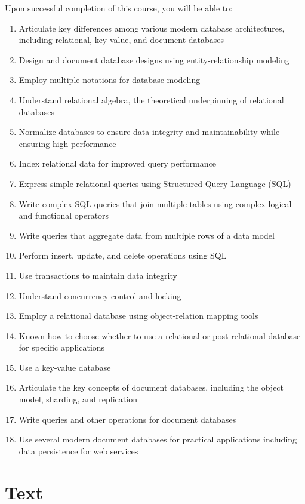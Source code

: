 \documentclass[11pt]{article}
\begin{document}
Upon successful completion of this course,
you will be able to:
\begin{enumerate}
\item Articulate key differences among various modern database architectures,
  including relational, key-value, and document databases
\item Design and document database designs using entity-relationship modeling
\item Employ multiple notations for database modeling
\item Understand relational algebra,
  the theoretical underpinning of relational databases
\item Normalize databases to ensure data integrity and maintainability
  while ensuring high performance
\item Index relational data for improved query performance
\item Express simple relational queries using Structured Query Language (SQL)
\item Write complex SQL queries
  that join multiple tables
  using complex logical and functional operators
\item Write queries that aggregate data from multiple rows of a data model
\item Perform insert, update, and delete operations using SQL
\item Use transactions to maintain data integrity
\item Understand concurrency control and locking
\item Employ a relational database using object-relation mapping tools
\item Known how to choose whether to use a relational or post-relational
  database for specific applications
\item Use a key-value database
\item Articulate the key concepts of document databases,
  including the object model, sharding, and replication
\item Write queries and other operations for document databases
\item Use several modern document databases for practical applications
  including data persistence for web services
\end{enumerate}

\section{Text}
\end{document}
